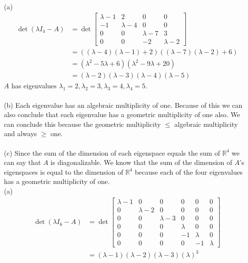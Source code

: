 \documentclass{report}
\begin{document}
\sol \\
(a) 
$$
\begin{aligned}
\det(\lambda I_4 - A) &= \det\begin{bmatrix}
\lambda-1&2&0&0\\
-1&\lambda-4&0&0\\
0&0&\lambda-7&3\\
0&0&-2&\lambda-2
\end{bmatrix} \\
&= ((\lambda-4)(\lambda-1)+2)((\lambda-7)(\lambda-2)+6) \\
&= (\lambda^2-5\lambda+6)(\lambda^2-9\lambda+20)\\
&= (\lambda-2)(\lambda-3)(\lambda-4)(\lambda-5)
\end{aligned}
$$
$A$ has eigenvalues $\lambda_1 = 2,  \lambda_2=3,\lambda_3=4,\lambda_4=5$.  \\
\\
\noindent (b) Each eigenvalue has an algebraic multiplicity of one.  Because of this we can also conclude that each eigenvalue has a geometric multiplicity of one also.  We can conclude this because the geometric multiplicity $\le$ algebraic multiplicity and always $\ge$ one.  \\
\\
\noindent (c) Since the sum of the dimension of each eigenspace equals the sum of $\mathbb{R}^4$ we can say that $A$ is diagonalizable.  We know that the sum of the dimension of $A$'s eigenspaces is equal to the dimension of $\mathbb{R}^4$ because each of the four eigenvalues has a geometric multiplicity of one. 
\pagebreak
{}
\sol \\
(a)
$$
\begin{aligned}
\det(\lambda I_6 - A) &= \det\begin{bmatrix}
\lambda-1& 0 & 0 & 0 & 0 & 0 \\
0 & \lambda-2 & 0 & 0 & 0 & 0 \\
0 & 0 & \lambda-3 & 0 & 0 & 0 \\
0 & 0 & 0 & \lambda & 0 & 0 \\
0 & 0 & 0 & -1 & \lambda & 0 \\
0 & 0 & 0 & 0 & -1 & \lambda
\end{bmatrix}\\
&=(\lambda-1)(\lambda-2)(\lambda-3)(\lambda)^3
\end{aligned}
$$
\end{document}
